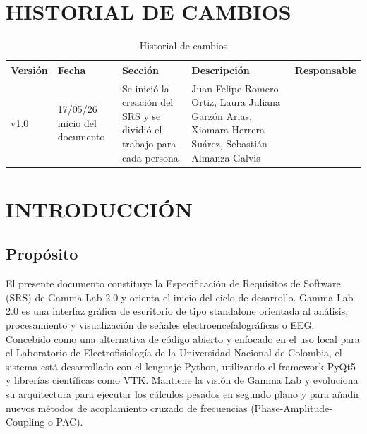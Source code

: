 \documentclass[12pt, letterpaper]{article}
\begin{document}
\section*{HISTORIAL DE CAMBIOS}
\begin{table}[h!]
\centering
\small
\begin{tabularx}{\textwidth}{|l|l|X|X|X|}
\hline
\textbf{Versión} & \textbf{Fecha} & \textbf{Sección} & \textbf{Descripción} & \textbf{Responsable} \\ \hline
v1.0 & 17/05/26 inicio del documento & Se inició la creación del SRS y se dividió el trabajo para cada persona & Juan Felipe Romero Ortiz, Laura Juliana Garzón Arias,  Xiomara Herrera Suárez, Sebastián Almanza Galvis \\ \hline
\end{tabularx}
\caption{Historial de cambios}
\end{table}

\newpage
\renewcommand{\contentsname}{CONTENIDO}
\tableofcontents

\newpage
{}
\listoftables

\newpage
{}
\listoffigures

\newpage
\section{INTRODUCCIÓN}
\subsection{Propósito}

El presente documento constituye la Especificación de Requisitos de Software (SRS) de Gamma Lab 2.0 y orienta el inicio del ciclo de desarrollo.
Gamma Lab 2.0 es una interfaz gráfica de escritorio de tipo standalone orientada al análisis, procesamiento y visualización de señales electroencefalográficas o EEG. Concebido como una alternativa de código abierto y enfocado en el uso local para el Laboratorio de Electrofisiología de la Universidad Nacional de Colombia, el sistema está desarrollado con el lenguaje Python, utilizando el framework PyQt5 y librerías científicas como VTK. Mantiene la visión de Gamma Lab y evoluciona su arquitectura para ejecutar los cálculos pesados en segundo plano y para añadir nuevos métodos de acoplamiento cruzado de frecuencias (Phase-Amplitude-Coupling o PAC).
\end{document}
